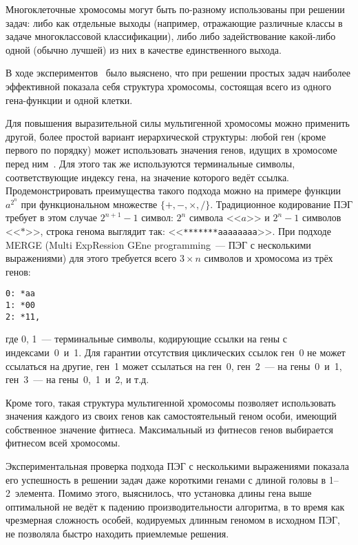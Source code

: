 Многоклеточные хромосомы могут быть по-разному использованы при решении задач: либо как отдельные выходы (например, отражающие различные классы в задаче многоклассовой классификации), либо либо задействование какой-либо одной (обычно лучшей) из них в качестве единственного выхода.

В ходе экспериментов~\cite{Ferreira:2006:GSP} было выяснено, что при решении простых задач наиболее эффективной показала себя структура хромосомы, состоящая всего из одного гена-функции и одной клетки.

Для повышения выразительной силы мультигенной хромосомы можно применить другой, более простой вариант иерархической структуры: любой ген (кроме первого по порядку) может использовать значения генов, идущих в хромосоме перед ним~\cite{Dai:2008:MNE:1473243.1473311}. Для этого так же используются терминальные символы, соответствующие индексу гена, на значение которого ведёт ссылка. Продемонстрировать преимущества такого подхода можно на примере функции $a^{2^n}$ при функциональном множестве $\{+, -, \times, /\}$. Традиционное кодирование ПЭГ требует в этом случае $2^{n+1} - 1$ символ: $2^n$ символа <<$a$>> и $2^n - 1$ символов <<$*$>>, строка генома выглядит так: <<\verb|*******aaaaaaaa|>>. При подходе MERGE (Multi ExpRession GEne programming~--- ПЭГ с несколькими выражениями) для этого требуется всего $3 \times n$ символов и хромосома из трёх генов:

\begin{samepage}
\begin{verbatim}
0: *aa
1: *00
2: *11,
\end{verbatim}
\end{samepage}

где 0, 1~--- терминальные символы, кодирующие ссылки на гены с индексами~0~и~1. Для гарантии отсутствия циклических ссылок ген~0 не может ссылаться на другие, ген~1 может ссылаться на ген~0, ген~2~--- на гены~0~и~1, ген~3~--- на гены~0,~1~и~2, и т.д.

Кроме того, такая структура мультигенной хромосомы позволяет использовать значения каждого из своих генов как самостоятельный геном особи, имеющий собственное значение фитнеса. Максимальный из фитнесов генов выбирается фитнесом всей хромосомы.

Экспериментальная проверка подхода ПЭГ с несколькими выражениями показала его успешность в решении задач даже короткими генами с длиной головы в 1--2~элемента. Помимо этого, выяснилось, что установка длины гена выше оптимальной не ведёт к падению производительности алгоритма, в то время как чрезмерная сложность особей, кодируемых длинным геномом в исходном ПЭГ, не позволяла быстро находить приемлемые решения.

